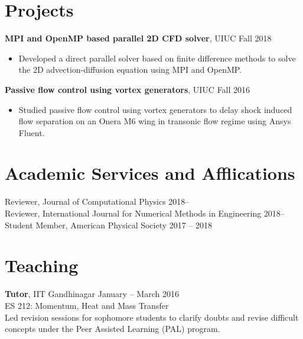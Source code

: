 \documentclass[margin]{res}
\begin{document}
\begin{resume}

\section{\large Projects}

{\bf MPI and OpenMP based parallel 2D CFD solver}, UIUC \hfill Fall 2018
\begin{itemize}
\item Developed a direct parallel solver based on finite difference methods to solve the 2D advection-diffusion equation using MPI and OpenMP.
\end{itemize}

{\bf Passive flow control using vortex generators}, UIUC \hfill Fall 2016
\begin{itemize}
\item Studied passive flow control using vortex generators to delay shock induced flow separation on an Onera M6 wing in transonic flow regime using Ansys Fluent.
\end{itemize}

\section{\large Academic Services and Afflications}		 
Reviewer, Journal of Computational Physics \hfill 2018--\vspace{0.1cm}\\
Reviewer, International Journal for Numerical Methods in Engineering \hfill 2018--\vspace{0.1cm}\\
Student Member, American Physical Society \hfill 2017 -- 2018\vspace{0.1cm}
		 
\section{\large Teaching}
{\bf Tutor}, IIT Gandhinagar \hfill January -- March 2016 \\
ES 212: Momentum, Heat and Mass Transfer\\
Led revision sessions for sophomore students to clarify doubts and revise difficult concepts under the Peer Assisted Learning (PAL) program.


\end{resume}
\end{document}
